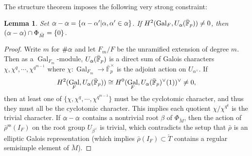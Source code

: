 \documentclass[11pt]{amsart}
\newtheorem{lem}[thm]{Lemma}
\theoremstyle{definition}
\newcommand{\doublestroke}[1]{\pdfliteral{1 Tr .3 w}#1\pdfliteral{0 Tr 0 w}}
\newcommand{\Balpha}{\doublestroke{\alpha}}
\renewcommand{\SS}{{\operatorname{ss}}}
\newcommand{\bFp}{\bar{\mathbb{F}}_p}
\newcommand{\bM}{\breve{M}}
\newcommand{\bT}{\breve{T}}
\DeclareMathOperator{\Gal}{Gal}
\begin{document}
The structure theorem imposes
the following very strong constraint:

\begin{lem}
\rm
Set
$
\Balpha-\Balpha=\{\alpha-\alpha'|\alpha,\alpha'\in \Balpha\}
$.
If $H^2(\Gal_F, U_{\Balpha}(\bFp))\neq 0$,
then
$(\Balpha-\Balpha)\cap \Phi_{\bM}=\{0\}$.
\end{lem}

\begin{proof}
Write $m$ for $\#\Balpha$
and let $F_m/F$ be the unramified extension of degree $m$.
Then as a $\Gal_{F_m}$-module,
$U_{\Balpha}(\bFp)$
is a direct sum of Galois characters
$\chi, \chi^q, \cdots, \chi^{q^{m-1}}$
where $\chi:\Gal_{F_m}\to \bFp^\times$
is the adjoint action on $U_{\alpha^\vee}$.
If
\[
H^2(\Gal_F, U_{\Balpha}(\bFp))
\cong H^0(\Gal_F, U_{\Balpha}(\bFp)^\vee(1))^\vee
\neq 0,
\]
then at least one of
$\{\chi, \chi^q, \cdots, \chi^{q^{m-1}}\}$
must be the cyclotomic character,
and thus they must all be the cyclotomic character.
This implies each quotient
$\chi/\chi^{q^k}$ is the trivial character.
If $\Balpha-\Balpha$ contains a nontrivial root
$\beta$
of $\Phi_{\bM}$,
then the action of $\bar\rho^\SS(I_F)$
on the root group $U_{\beta^\vee}$ is trivial,
which contradicts the setup
that $\bar\rho$ is an elliptic Galois representation
(which implies $\bar\rho(I_F)\subset \bT$
contains a regular semisimple element of $\bM$).
\end{proof}
\end{document}

